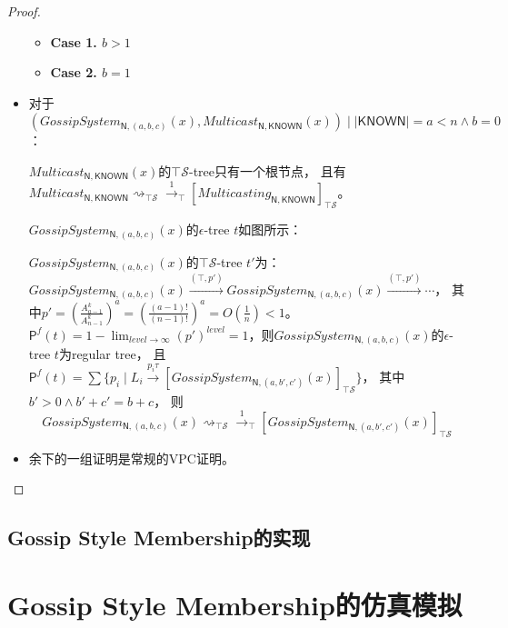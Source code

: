 \begin{proof}
\begin{itemize}
{        %
        \begin{itemize}
            \item {\textbf{Case 1. $b>1$}}
            \item {\textbf{Case 2. $b=1$}}
        \end{itemize}
    }
    \item {
        对于$(GossipSystem_{\mathsf{N},(a,b,c)}(x), Multicast_{\mathsf{N}, \mathsf{KNOWN}}(x))\mid |\mathsf{KNOWN}| = a < n \wedge b= 0$：

        $Multicast_{\mathsf{N}, \mathsf{KNOWN}}(x)$的$\top \mathcal{S}$-tree只有一个根节点，
        且有$Multicast_{\mathsf{N}, \mathsf{KNOWN}}\rightsquigarrow_{\top\mathcal{S}}\stackrel{1}{\rightarrow}_{\top}[Multicasting_{\mathsf{N}, \mathsf{KNOWN}}]_{\top \mathcal{S}}$。

        $GossipSystem_{\mathsf{N},(a,b,c)}(x)$的$\epsilon$-tree $t$如图所示：

        $GossipSystem_{\mathsf{N},(a,b,c)}(x)$的$\top\mathcal{S}$-tree $t'$为：
        $GossipSystem_{\mathsf{N},(a,b,c)}(x)\stackrel{(\top,p')}{\rightarrow}GossipSystem_{\mathsf{N},(a,b,c)}(x)\stackrel{(\top,p')}{\rightarrow}\cdots$，
        其中$p'= (\frac{A^k_{a-1}}{A^k_{n-1}})^a = (\frac{(a-1)!}{(n-1)!})^a = O(\frac{1}{n})<1$。
        $\mathsf{P}^f(t) = 1-\lim_{level\rightarrow \infty} (p')^{level} = 1$，则$GossipSystem_{\mathsf{N},(a,b,c)}(x)$的$\epsilon$-tree $t$为regular tree，
        且$\mathsf{P}^f(t) = \sum \{p_i\mid L_i\stackrel{p_i\tau}{\rightarrow} [GossipSystem_{\mathsf{N},(a,b',c')}(x)]_{\top \mathcal{S}}\}$，
        其中$b'>0 \wedge b'+c'=b+c$，
        则
        $$GossipSystem_{\mathsf{N},(a,b,c)}(x)\rightsquigarrow_{\top\mathcal{S}}\stackrel{1}{\rightarrow}_{\top}[GossipSystem_{\mathsf{N},(a,b',c')}(x)]_{\top \mathcal{S}}$$
    }
    \item {
        余下的一组证明是常规的VPC证明。
    }
 \end{itemize}

\end{proof}
\subsection{Gossip Style Membership的实现}

\section{Gossip Style Membership的仿真模拟}